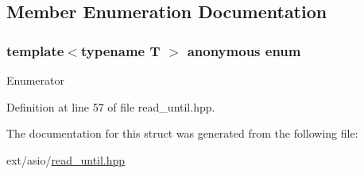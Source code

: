 \subsection{Member Enumeration Documentation}
\hypertarget{structasio_1_1is__match__condition_afe8389939a27ff4c6ea99aa7832102bc}{}\subsubsection[{anonymous enum}]{\setlength{\rightskip}{0pt plus 5cm}template$<$typename T $>$ anonymous enum}\label{structasio_1_1is__match__condition_afe8389939a27ff4c6ea99aa7832102bc}
\begin{Desc}
\item[Enumerator]\par
\begin{description}
\item[{\em 
\hypertarget{structasio_1_1is__match__condition_afe8389939a27ff4c6ea99aa7832102bca2aba8c96f065178b82ad75dff454778e}{}value\label{structasio_1_1is__match__condition_afe8389939a27ff4c6ea99aa7832102bca2aba8c96f065178b82ad75dff454778e}
}]\end{description}
\end{Desc}


Definition at line 57 of file read\+\_\+until.\+hpp.



The documentation for this struct was generated from the following file\+:\begin{DoxyCompactItemize}
\item 
ext/asio/\hyperlink{read__until_8hpp}{read\+\_\+until.\+hpp}\end{DoxyCompactItemize}
